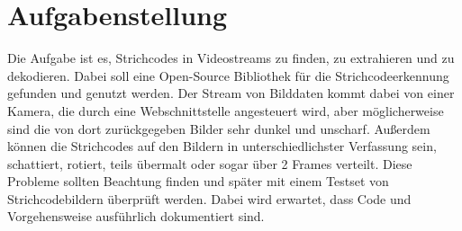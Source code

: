 \section{Aufgabenstellung}
Die Aufgabe ist es, Strichcodes in Videostreams zu finden, zu extrahieren und zu dekodieren. Dabei soll eine Open-Source Bibliothek für die Strichcodeerkennung gefunden und genutzt werden.
Der Stream von Bilddaten kommt dabei von einer Kamera, die durch eine Webschnittstelle angesteuert wird, aber möglicherweise sind die von dort zurückgegeben Bilder sehr dunkel und unscharf. Außerdem können die Strichcodes auf den Bildern in unterschiedlichster Verfassung sein, schattiert, rotiert, teils übermalt oder sogar über 2 Frames verteilt.
Diese Probleme sollten Beachtung finden und später mit einem Testset von Strichcodebildern %
überprüft werden.
Dabei wird erwartet, dass Code und Vorgehensweise ausführlich dokumentiert sind.